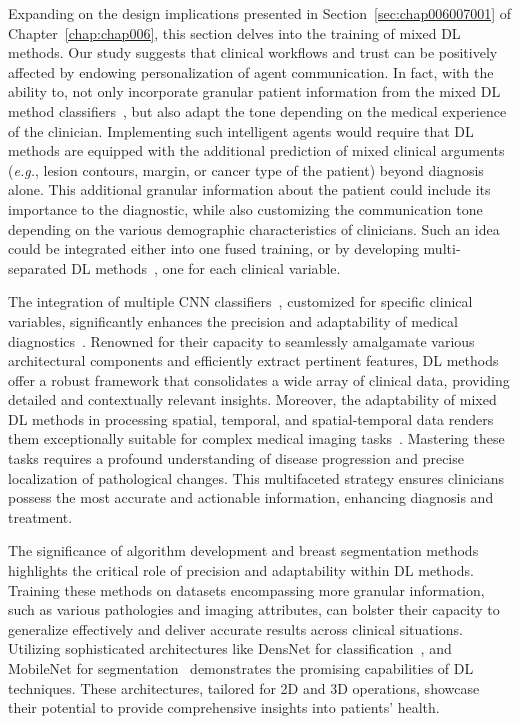 Expanding on the design implications presented in Section~\ref{sec:chap006007001} of Chapter~\ref{chap:chap006}, this section delves into the training of mixed \ac{DL} methods.
Our study suggests that clinical workflows and trust can be positively affected by endowing personalization of agent communication.
In fact, with the ability to, not only incorporate granular patient information from the mixed \ac{DL} method classifiers~\cite{doi:10.1148/radiol.2018181371}, but also adapt the tone depending on the medical experience of the clinician.
Implementing such intelligent agents would require that \ac{DL} methods are equipped with the additional prediction of mixed clinical arguments ({\it e.g.}, lesion contours, margin, or cancer type of the patient) beyond diagnosis alone.
This additional granular information about the patient could include its importance to the diagnostic, while also customizing the communication tone depending on the various demographic characteristics of clinicians.
Such an idea could be integrated either into one fused training, or by developing multi-separated \ac{DL} methods~\cite{RIASATIAN2021102032}, one for each clinical variable.

\textcolor{revised}{The integration of multiple \ac{CNN} classifiers~\cite{10230686}, customized for specific clinical variables, significantly enhances the precision and adaptability of medical diagnostics~\cite{doi:10.1148/radiol.2018181371}.
Renowned for their capacity to seamlessly amalgamate various architectural components and efficiently extract pertinent features, \ac{DL} methods offer a robust framework that consolidates a wide array of clinical data, providing detailed and contextually relevant insights.
Moreover, the adaptability of mixed \ac{DL} methods in processing spatial, temporal, and spatial-temporal data renders them exceptionally suitable for complex medical imaging tasks~\cite{9730804}.
Mastering these tasks requires a profound understanding of disease progression and precise localization of pathological changes.
This multifaceted strategy ensures clinicians possess the most accurate and actionable information, enhancing diagnosis and treatment.}

\textcolor{revised}{The significance of algorithm development and breast segmentation methods highlights the critical role of precision and adaptability within \ac{DL} methods.
Training these methods on datasets encompassing more granular information, such as various pathologies and imaging attributes, can bolster their capacity to generalize effectively and deliver accurate results across clinical situations.
Utilizing sophisticated architectures like  DensNet for classification~\cite{CALISTO2022102285}, and MobileNet for segmentation~\cite{10230448} demonstrates the promising capabilities of \ac{DL} techniques.
These architectures, tailored for 2D and 3D operations, showcase their potential to provide comprehensive insights into patients' health.}

